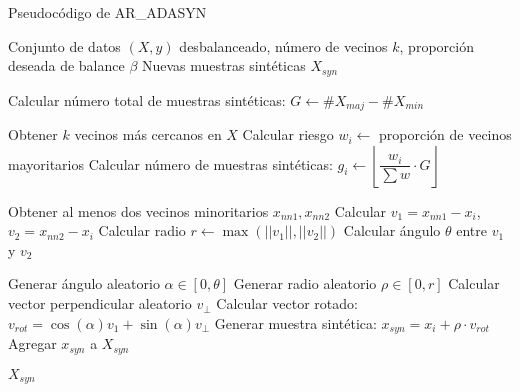 \begin{algorithm}[H]
\caption{Pseudocódigo de AR\_ADASYN}
\begin{algorithmic}[1]
\Require Conjunto de datos $(X, y)$ desbalanceado, número de vecinos $k$, proporción deseada de balance $\beta$
\Ensure Nuevas muestras sintéticas $X_{syn}$

\State Calcular número total de muestras sintéticas: $G \gets \#X_{maj} - \#X_{min}$

    \State Obtener $k$ vecinos más cercanos en $X$
    \State Calcular riesgo $w_i \gets$ proporción de vecinos mayoritarios
    \State Calcular número de muestras sintéticas: $g_i \gets \left\lfloor \dfrac{w_i}{\sum w} \cdot G \right\rfloor$
\EndFor

    \State Obtener al menos dos vecinos minoritarios $x_{nn1}, x_{nn2}$
    \State Calcular $v_1 = x_{nn1} - x_i$, $v_2 = x_{nn2} - x_i$
    \State Calcular radio $r \gets \max(||v_1||, ||v_2||)$
    \State Calcular ángulo $\theta$ entre $v_1$ y $v_2$
    
        \State Generar ángulo aleatorio $\alpha \in [0, \theta]$
        \State Generar radio aleatorio $\rho \in [0, r]$
        \State Calcular vector perpendicular aleatorio $v_\perp$
        \State Calcular vector rotado: $v_{rot} = \cos(\alpha)v_1 + \sin(\alpha)v_\perp$
        \State Generar muestra sintética: $x_{syn} = x_i + \rho \cdot v_{rot}$
        \State Agregar $x_{syn}$ a $X_{syn}$
    \EndFor
\EndFor

\State \Return $X_{syn}$
\end{algorithmic}
\end{algorithm}

